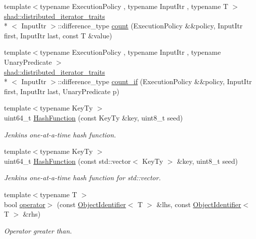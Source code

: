 \begin{DoxyCompactItemize}
\item 
{\footnotesize template$<$typename Execution\-Policy , typename Input\-Itr , typename T $>$ }\\\hyperlink{structshad_1_1distributed__iterator__traits}{shad\-::distributed\-\_\-iterator\-\_\-traits}\\*
$<$ Input\-Itr $>$\-::difference\-\_\-type \hyperlink{namespaceshad_a2abc6976d67b071eccbb8d17e9a602fe}{count} (Execution\-Policy \&\&policy, Input\-Itr first, Input\-Itr last, const T \&value)
\item 
{\footnotesize template$<$typename Execution\-Policy , typename Input\-Itr , typename Unary\-Predicate $>$ }\\\hyperlink{structshad_1_1distributed__iterator__traits}{shad\-::distributed\-\_\-iterator\-\_\-traits}\\*
$<$ Input\-Itr $>$\-::difference\-\_\-type \hyperlink{namespaceshad_a08f4233aef9435fb627ebb82d186715e}{count\-\_\-if} (Execution\-Policy \&\&policy, Input\-Itr first, Input\-Itr last, Unary\-Predicate p)
\item 
{\footnotesize template$<$typename Key\-Ty $>$ }\\uint64\-\_\-t \hyperlink{namespaceshad_a21c73a78973e58a8ed4a246a74bff5b9}{Hash\-Function} (const Key\-Ty \&key, uint8\-\_\-t seed)
\begin{DoxyCompactList}\small\item\em Jenkins one-\/at-\/a-\/time hash function. \end{DoxyCompactList}\item 
{\footnotesize template$<$typename Key\-Ty $>$ }\\uint64\-\_\-t \hyperlink{namespaceshad_a1bce4c68f2c688517fdc5dca70da59da}{Hash\-Function} (const std\-::vector$<$ Key\-Ty $>$ \&key, uint8\-\_\-t seed)
\begin{DoxyCompactList}\small\item\em Jenkins one-\/at-\/a-\/time hash function for std\-::vector. \end{DoxyCompactList}\item 
{\footnotesize template$<$typename T $>$ }\\bool \hyperlink{namespaceshad_a6eca4ffdbc7555d2e0b549a0a6eeffdd}{operator$>$} (const \hyperlink{classshad_1_1ObjectIdentifier}{Object\-Identifier}$<$ T $>$ \&lhs, const \hyperlink{classshad_1_1ObjectIdentifier}{Object\-Identifier}$<$ T $>$ \&rhs)
\begin{DoxyCompactList}\small\item\em Operator greater than. \end{DoxyCompactList}\item 

\end{DoxyCompactItemize}
